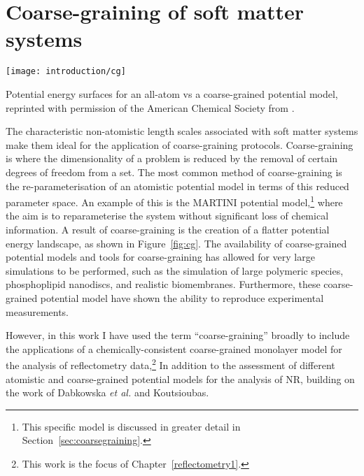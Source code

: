 \section{Coarse-graining of soft matter systems}
%
\begin{marginfigure}
    \texttt{[image: introduction/cg]}
    \caption{Potential energy surfaces for an all-atom vs a coarse-grained potential model, reprinted with permission of the American Chemical Society from \cite{kmiecik_coarse-grained_2016}.}
    \label{fig:cg}
\end{marginfigure}
%
The characteristic non-atomistic length scales associated with soft matter systems make them ideal for the application of coarse-graining protocols.
Coarse-graining is where the dimensionality of a problem is reduced by the removal of certain degrees of freedom from a set.
The most common method of coarse-graining is the re-parameterisation of an atomistic potential model in terms of this reduced parameter space.
An example of this is the MARTINI potential model,\footnote{This specific model is discussed in greater detail in Section~\ref{sec:coarsegraining}.} where the aim is to reparameterise the system without significant loss of chemical information.
A result of coarse-graining is the creation of a flatter potential energy landscape, as shown in Figure~\ref{fig:cg}.
The availability of coarse-grained potential models and tools for coarse-graining has allowed for very large simulations to be performed, such as the simulation of large polymeric species, phosphoplipid nanodiscs, and realistic biomembranes.
Furthermore, these coarse-grained potential model have shown the ability to reproduce experimental measurements.

However, in this work I have used the term ``coarse-graining'' broadly to include the applications of a chemically-consistent coarse-grained monolayer model for the analysis of reflectometry data,\footnote{This work is the focus of Chapter~\ref{reflectometry1}.}
In addition to the assessment of different atomistic and coarse-grained potential models for the analysis of NR, building on the work of Dabkowska \emph{et al.} and Koutsioubas.
